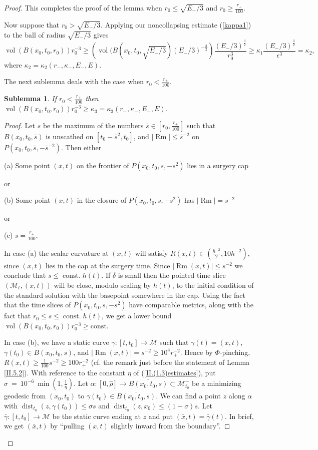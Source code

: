 \documentclass[12pt]{amsart}
\newcommand{\al}{\alpha}
\newcommand{\const}{\operatorname{const.}}
\newcommand{\dist}{\operatorname{dist}}
\newcommand{\M}{{\mathcal M}}
\newcommand{\Rm}{\operatorname{Rm}}
\newcommand{\vol}{\operatorname{vol}}
\newcommand{\de}{\delta}
\newcommand{\eps}{\epsilon}
\newcommand{\ga}{\gamma}
\newcommand{\ol}{\overline}
\newcommand{\ra}{\rightarrow}
\numberwithin{equation}{section}
\theoremstyle{plain}
\newtheorem{sublemma}[equation]{Sublemma}
\theoremstyle{definition}
\theoremstyle{remark}
\begin{document}
\begin{proof}
This completes the proof of the lemma when 
$r_0\leq \sqrt{E_-/3}$
and $r_0\geq \frac{r_+}{100}$.

Now suppose that $r_0>\sqrt{E_-/3}$.  Applying our 
noncollapsing estimate (\ref{kappa1}) to the ball of radius
$\sqrt{E_-/3}$ gives 
\begin{equation}
\vol(B(x_0,t_0,r_0))r_0^{-3}\geq \left(\vol(B(x_0,t_0,\sqrt{E_-/3}) (E_-/3)^{-\frac32}
\right)\frac{(E_-/3)^{\frac32}}{r_0^3}
\geq \kappa_1\frac{(E_-/3)^{\frac32}}{\eps^3}=\kappa_2,
\end{equation}
where $\kappa_2=\kappa_2(r_-,\kappa_-,E_-,E)$.

The next sublemma deals with the case when $r_0< \frac{r_+}{100}$.
\begin{sublemma}
\label{r0/100}
If $r_0< \frac{r_+}{100}$ then $\vol(B(x_0,t_0,r_0))r_0^{-3}\geq
\kappa_3=\kappa_3(r_-,\kappa_-,E_-,E)$.
\end{sublemma}
\begin{proof}
Let $s$ be the maximum of the numbers $\bar s\in [r_0,\frac{r_+}{100}]$
such that $B(x_0,t_0,\bar s)$ is unscathed on $[t_0-\bar s^2,t_0]$,
and $|\Rm|\leq \bar s^{-2}$ on $P(x_0,t_0,\bar s,-\bar s^{-2})$.
Then  either

(a) Some point $(x,t)$ on the frontier of $P(x_0,t_0,s,-s^2)$
lies in a surgery cap

or

(b) Some point $(x,t)$ in the closure of $P(x_0,t_0,s,-s^2)$
has $|\Rm|=s^{-2}$


or

(c) $s=\frac{r_+}{100}$.

In case (a) the scalar curvature
at $(x,t)$ will satisfy $R(x,t)\in (\frac{h^{-2}}{2},10h^{-2})$, 
since $(x,t)$ lies in the cap at the surgery time.  Since
$|\Rm(x,t)|\leq s^{-2}$ we conclude that $s \le \const h(t)$.
If $\bar\de$ is small then the pointed time slice
$(\M_t,(x,t))$ will be close, modulo scaling by $h(t)$, to
the initial condition of the standard solution with
the basepoint somewhere in the cap.  Using the
fact that the time slices of $P(x_0,t_0,s,-s^2)$ have  
comparable metrics, along with the fact that 
$r_0 \le s  \le \const h(t)$, we get a lower bound 
$\vol(B(x_0,t_0,r_0))r_0^{-3}\geq \mbox{const}$.

In case (b), we have a static curve $\ga:[t,t_0]\ra\M$
such that $\ga(t)=(x,t)$, $\ga(t_0)\in \ol{B(x_0,t_0,s)}$,
and $|\Rm(x,t)|=s^{-2}\geq 10^4r_+^{-2}$. 
Hence by $\Phi$-pinching,
$R(x,t)\geq \frac{1}{100} s^{-2} \geq 100 r_+^{-2}$
(cf. the remark just before the statement of
Lemma \ref{II.5.2}).
With reference to the constant $\eta$ of
(\ref{II.(1.3)estimates}), 
put $\sigma \: = \: 10^{-6} \: \min \left( 1, 
\frac{1}{\eta} \right)$.
Let 
$\al:[0,\widehat{\rho}]\ra \ol{B(x_0,t_0,s)}\subset \M_{t_0}^-$
be a minimizing geodesic from $(x_0,t_0)$ to 
$\ga(t_0)\in \ol{B(x_0,t_0,s)}$. We can find a point
$z$ along $\alpha$ with $\dist_{t_0}(z, \gamma(t_0)) \le \sigma s$ and
$\dist_{t_0}(z, x_0) \le (1 - \sigma) s$.
Let $\bar\ga:[t,t_0]\ra\M$
be the static curve ending at $z$
and put $(\bar x,t)= \bar\ga(t)$.  In brief,
we get $(\bar x,t)$ by ``pulling $(x,t)$ slightly
inward from the boundary''.


\end{proof}
\end{proof}
\end{document}
